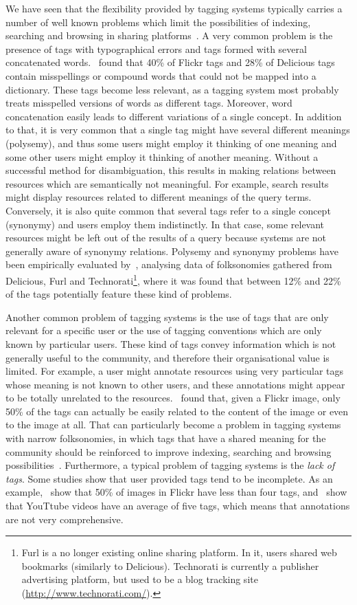 We have seen that the flexibility provided by tagging systems typically carries a number of well known problems which limit the possibilities of indexing, searching and browsing in sharing platforms~\citep{golder2006,halpin2006,Guy2006}. A very common problem is the presence of tags with typographical errors and tags formed with several concatenated words.~\cite{Guy2006} found that 40\% of Flickr tags and 28\% of Delicious tags contain misspellings or compound words that could not be mapped into a dictionary. These tags become less relevant, as a tagging system most probably treats misspelled versions of words as different tags. Moreover, word concatenation easily leads to different variations of a single concept.
In addition to that, it is very common that a single tag might have several different meanings (polysemy), and thus some users might employ it thinking of one meaning and some other users might employ it thinking of another meaning. Without a successful method for disambiguation, this results in making relations between resources which are semantically not meaningful. For example, search results might display resources related to different meanings of the query terms. Conversely, it is also quite common that several tags refer to a single concept (synonymy) and users employ them indistinctly. In that case, some relevant resources might be left out of the results of a query because systems are not generally aware of synonymy relations. Polysemy and synonymy problems have been empirically evaluated by~\cite{Spiteri2006}, analysing data of folksonomies gathered from Delicious, Furl and Technorati\footnote{Furl is a no longer existing online sharing platform. In it, users shared web bookmarks (similarly to Delicious). Technorati is currently a publisher advertising platform, but used to be a blog tracking site (\url{http://www.technorati.com/}).}, where it was found that between 12\% and 22\% of the tags potentially feature these kind of problems.

Another common problem of tagging systems is the use of tags that are only relevant for a specific user or the use of tagging conventions which are only known by particular users. These kind of tags convey information which is not generally useful to the community, and therefore their organisational value is limited. For example, a user might annotate resources using very particular tags whose meaning is not known to other users, and these annotations might appear to be totally unrelated to the resources.~\cite{Kennedy2006a} found that, given a Flickr image, only 50\% of the tags can actually be easily related to the content of the image or even to the image at all.
That can particularly become a problem in tagging systems with narrow folksonomies, in which tags that have a shared meaning for the community should be reinforced to improve indexing, searching and browsing possibilities~\citep{Guy2006}. 
Furthermore, a typical problem of tagging systems is the \emph{lack of tags}. Some studies show that user provided tags tend to be incomplete. As an example,~\cite{Sigurbjornsson2008} show that 50\% of images in Flickr have less than four tags, and~\cite{Zhao2010} show that YouTtube videos have an average of five tags, which means that annotations are not very comprehensive.

